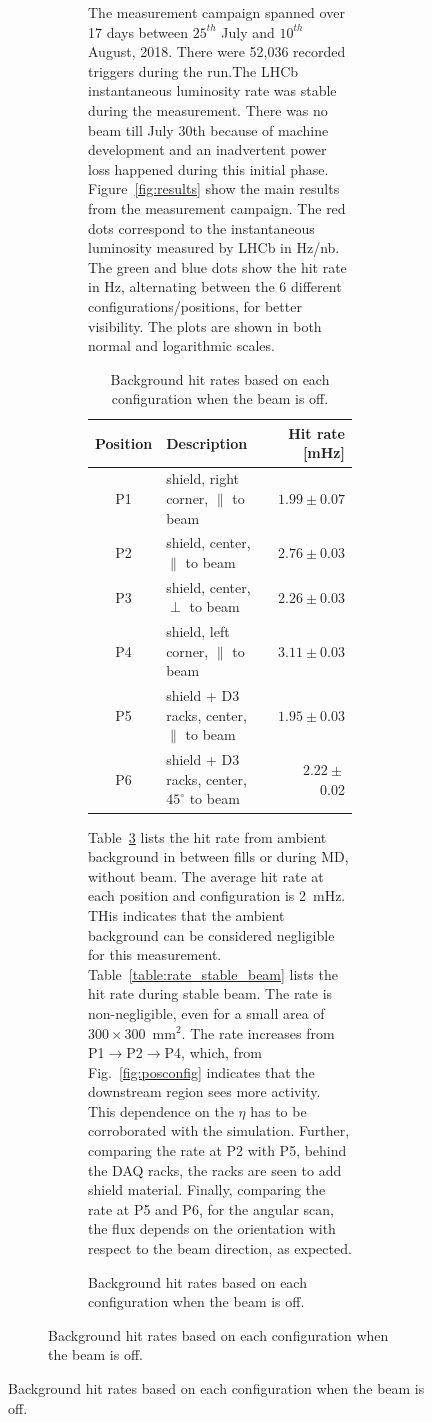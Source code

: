 \begin{figure}
{\begin{figure}
{\begin{figure}
{The measurement campaign spanned over 17 days between $25^{th}$ July and $10^{th}$ August, 2018. There were 52,036 recorded triggers during the run.The LHCb instantaneous luminosity rate was stable during the measurement. There was no beam till July 30th because of machine development and an inadvertent power loss happened during this initial phase. Figure~\ref{fig:results} show the main results from the measurement campaign. The red dots correspond to the instantaneous luminosity measured by LHCb in Hz/nb. The green and blue dots show the hit rate in Hz, alternating between the 6 different configurations/positions, for better visibility. The plots are shown in both normal and logarithmic scales.


\begin{table}
\begin{center}
\begin{tabular}{c|l|r}
  Position & \hspace{2cm}Description & Hit rate [mHz] \\
  \hline \hline
   P1 & shield, right corner, $\parallel$ to beam& $1.99\pm0.07$ \\ \hline
   P2 & shield, center, $\parallel$ to beam&  $2.76\pm 0.03$ \\ \hline
   P3 & shield, center, $\perp$ to beam& $ 2.26\pm 0.03$ \\ \hline
   P4 & shield, left corner, $\parallel$ to beam& $ 3.11\pm 0.03$ \\ \hline
   P5 & shield + D3 racks, center, $\parallel$ to beam& $ 1.95\pm 0.03$ \\ \hline
   P6 & shield + D3 racks, center, $45^\circ$ to beam& $ 2.22\pm $ 0.02\\ \hline
\end{tabular}
\caption{\label{table:rate_no_beam}
    Background hit rates based on each configuration when the beam is off.
}
\end{center}
\end{table}

Table~\ref{table:rate_no_beam} lists the hit rate from ambient background in between fills or during MD, without beam. The average hit rate at each position and configuration is 2~mHz.  THis indicates that the ambient background can be considered negligible for this measurement. Table~\ref{table:rate_stable_beam} lists the hit rate during stable beam. The rate is non-negligible, even for a small area of $300\times300$~mm$^2$. The rate increases from P1$\to$P2$\to$P4, which, from Fig.~\ref{fig:posconfig} indicates that the downstream region sees more activity. This dependence on the $\eta$ has to be corroborated with the simulation. Further, comparing the rate at P2 with P5, behind the DAQ racks, the racks are seen to add shield material. Finally, comparing the rate at P5 and P6, for the angular scan, the flux depends on the orientation with respect to the beam direction, as expected. 

}
\end{figure}}
\end{figure}}
\end{figure}
